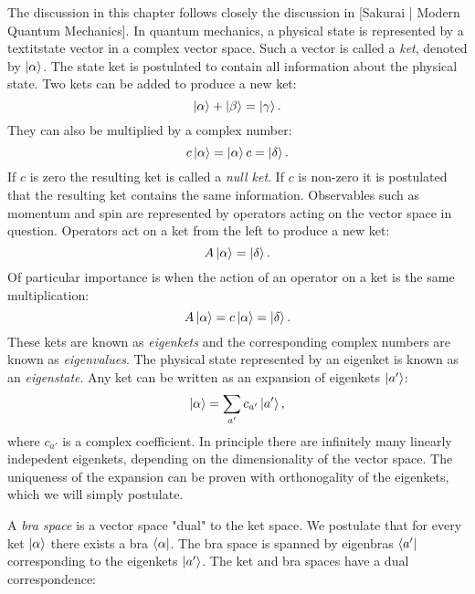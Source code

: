 The discussion in this chapter follows closely the discussion in
[Sakurai | Modern Quantum Mechanics].
\newline
In quantum mechanics, a physical state is represented by a textit{state vector}
in a complex vector space. Such a vector is called a \textit{ket}, denoted
by $\ket{\alpha}$. The state ket is postulated to contain all information
about the physical state. Two kets can be added to produce a new ket:
$$ \ket{\alpha} + \ket{\beta} = \ket{\gamma} .$$
They can also be multiplied by a complex number:
$$ c\ket{\alpha} = \ket{\alpha}c = \ket{\delta} .$$
If $c$ is zero the resulting ket is called a \textit{null ket}.
If $c$ is non-zero it is postulated that the resulting ket contains
the same information.
\newline
Observables such as momentum and spin are represented by operators
acting on the vector space in question. Operators
act on a ket from the left to produce a new ket:
$$ A \ket{\alpha} = \ket{\delta} .$$
Of particular importance is when the action of an operator
on a ket is the same multiplication:
$$ A \ket{\alpha} = c\ket{\alpha} = \ket{\delta} .$$
These kets are known as \textit{eigenkets} and the corresponding
complex numbers are known as \textit{eigenvalues}.
The physical state represented by an eigenket is known
as an \textit{eigenstate}. Any ket
can be written as an expansion of eigenkets $\ket{a'}$:
$$ \ket{\alpha} = \sum_{a'} c_{a'} \ket{a'} ,$$
where $c_{a'}$ is a complex coefficient. In principle
there are infinitely many linearly indepedent eigenkets,
depending on the dimensionality of the vector space.
The uniqueness of the expansion can be proven
with orthonogality of the eigenkets, which we will simply postulate.
\par
A \textit{bra space} is a vector space "dual" to the ket space.
We postulate that for every ket $\ket{\alpha}$ there exists a bra
$\bra{\alpha}$. The bra space is spanned by eigenbras $\bra{a'}$
corresponding to the eigenkets $\ket{a'}$. The ket and bra spaces
have a dual correspondence:
